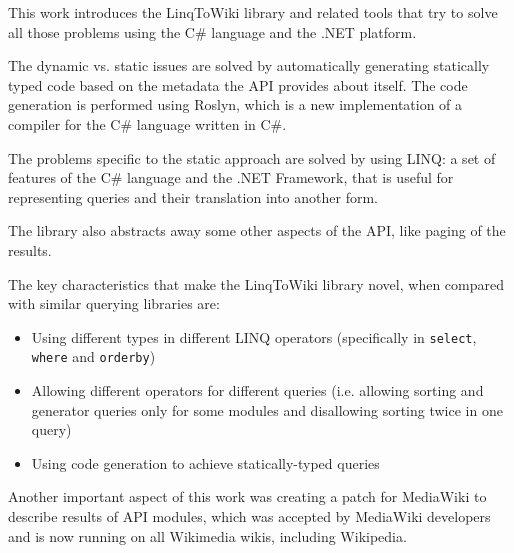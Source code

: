 \medskip

This work introduces the LinqToWiki library and related tools that try to solve all those problems
using the C\# language and the .NET platform.

The dynamic vs. static issues are solved by automatically generating statically typed
code based on the metadata the API provides about itself.
The code generation is performed using Roslyn,
which is a new implementation of a compiler for the C\# language written in C\#.

The problems specific to the static approach are solved by using \ac{LINQ}:
a set of features of the C\# language and the .NET Framework,
that is useful for representing queries and their translation into another form.

The library also abstracts away some other aspects of the \ac{API}, like paging of the results.


The key characteristics that make the LinqToWiki library novel, when compared with similar querying libraries are:

\begin{itemize}
\item Using different types in different LINQ operators
(specifically in \lstinline{select}, \lstinline{where} and \lstinline{orderby})
\item Allowing different operators for different queries
(i.e. allowing sorting and generator queries only for some modules and disallowing sorting twice in one query)
\item Using code generation to achieve statically-typed queries
\end{itemize}

Another important aspect of this work was creating a patch for MediaWiki to describe results of \ac{API} modules,
which was accepted by MediaWiki developers and is now running on all Wikimedia wikis, including Wikipedia.